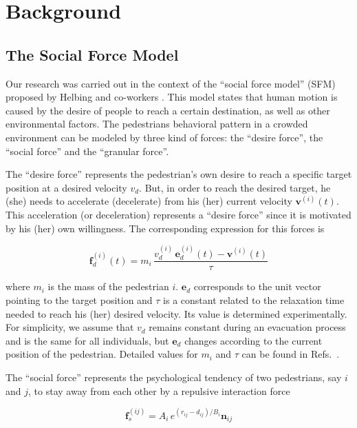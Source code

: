 \section{\label{background}Background}

\subsection{\label{sfm}The Social Force Model}

Our research was carried out in the context of the ``social force model'' (SFM) 
proposed by Helbing and co-workers \cite{Helbing1}. This model states that human 
motion is caused by the desire of people to reach a certain destination, as 
well as other environmental factors. The pedestrians behavioral pattern in a 
crowded environment can be modeled by three kind of forces: the ``desire 
force'', the ``social force'' and the ``granular force''. 

The ``desire force'' represents the pedestrian's own desire to reach a 
specific target position at a desired velocity $v_d$. But, in order to reach 
the desired target, he (she) needs to accelerate (decelerate) from his (her) 
current velocity $\mathbf{v}^{(i)}(t)$. This acceleration (or deceleration) 
represents a ``desire force'' since it is motivated by his (her) own 
willingness. The corresponding expression for this forces is 

\begin{equation}
        \mathbf{f}_d^ {(i)}(t) =  
m_i\,\displaystyle\frac{v_d^{(i)}\,\mathbf{e}_d^
{(i)}(t)-\mathbf{v}^{(i)}(t)}{\tau} \label{desired}
\end{equation}

\noindent where $m_i$ is the mass of the pedestrian $i$. $\mathbf{e}_d$ 
corresponds to the unit vector pointing to the target position and $\tau$ is a 
constant related to the relaxation time needed to reach his (her) desired 
velocity. Its value is determined experimentally. For simplicity, we assume that 
$v_d$ remains constant during an evacuation process and is the same for all 
individuals, but $\mathbf{e}_d$ changes according to the current position of the 
pedestrian. Detailed values for $m_i$ and $\tau$ can be found in 
Refs.~\cite{Helbing1,Dorso3}. 

The ``social force'' represents the psychological tendency of two pedestrians,  
say $i$ and $j$, to stay away from each other by a repulsive interaction force 

\begin{equation}
        \mathbf{f}_s^{(ij)} = A_i\,e^{(r_{ij}-d_{ij})/B_i}\mathbf{n}_{ij} 
        \label{social}
\end{equation}

